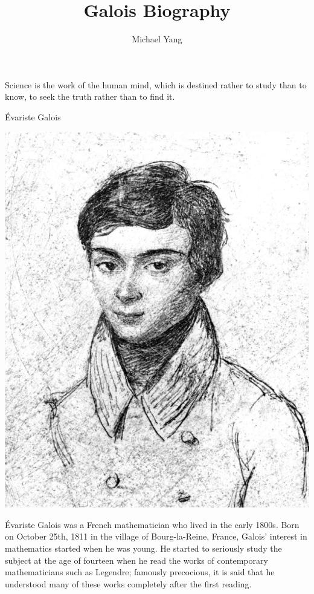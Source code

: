 \documentclass{article}
\title{Galois Biography}
\author{Michael Yang}
\begin{document}
\maketitle
\epigraph{Science is the work of the human mind, which is destined rather to study than to know, to seek the truth rather than to find it.}{\'Evariste Galois}

\begin{center}
    \includegraphics[scale=0.45]{images/galois.png}
\end{center}

Évariste Galois was a French mathematician who lived in the early 1800s. Born on October 25th, 1811 in the village of Bourg-la-Reine, France, Galois’ interest in mathematics started when he was young. He started to seriously study the subject at the age of fourteen when he read the works of contemporary mathematicians such as Legendre; famously precocious, it is said that he understood many of these works completely after the first reading. 
\end{document}
